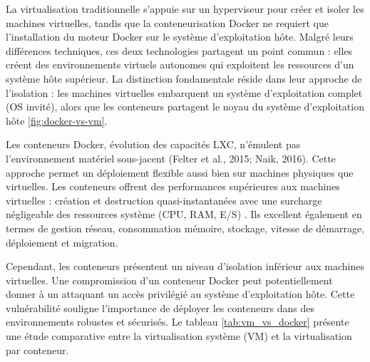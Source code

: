 La virtualisation traditionnelle s'appuie sur un hyperviseur pour créer et isoler les machines virtuelles, tandis que la conteneurisation Docker ne requiert que l'installation du moteur Docker sur le système d'exploitation hôte. Malgré leurs différences techniques, ces deux technologies partagent un point commun : elles créent des environnements virtuels autonomes qui exploitent les ressources d'un système hôte supérieur.
La distinction fondamentale réside dans leur approche de l'isolation : les machines virtuelles embarquent un système d'exploitation complet (OS invité), alors que les conteneurs partagent le noyau du système d'exploitation hôte \ref{fig:docker-vs-vm}.

Les conteneurs Docker, évolution des capacités LXC, n'émulent pas l'environnement matériel sous-jacent (Felter et al., 2015; Naik, 2016). Cette approche permet un déploiement flexible aussi bien sur machines physiques que virtuelles.
Les conteneurs offrent des performances supérieures aux machines virtuelles : création et destruction quasi-instantanées avec une surcharge négligeable des ressources système (CPU, RAM, E/S) \cite{jayasena2015auto}. Ils excellent également en termes de gestion réseau, consommation mémoire, stockage, vitesse de démarrage, déploiement et migration.

Cependant, les conteneurs présentent un niveau d'isolation inférieur aux machines virtuelles. Une compromission d'un conteneur Docker peut potentiellement donner à un attaquant un accès privilégié au système d'exploitation hôte. Cette vulnérabilité souligne l'importance de déployer les conteneurs dans des environnements robustes et sécurisés.
Le tableau \ref{tab:vm_vs_docker} présente une étude comparative entre la virtualisation système (VM) et la virtualisation par conteneur.

